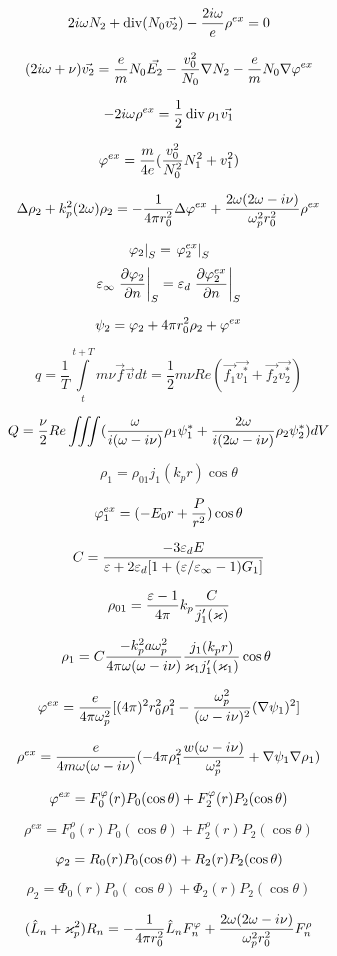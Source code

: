 \documentclass{article}
\begin{document}
\[ 2i\omega N_2 + \operatorname{div}(N_0 \vec{v_2}) - \frac{2i\omega}{e}\rho^{ex} = 0\]

\[ (2i\omega + \nu) \vec{v_2} = \frac{e}{m}N_0\vec{E_2} - \frac{v_0^2}{N_0} \nabla N_2 - \frac{e}{m} N_0 \nabla \varphi^{ex}  \]

\[ - 2i\omega \rho^{ex} = \frac{1}{2}\operatorname{div} \rho_1 \vec{v_1}\]

\[ \varphi^{ex} = \frac{m}{4e}(\frac{v_0^2}{N_0^2}N_1^2 + v_1^2)\]

\[ \Delta \rho_2 + k_p^2(2\omega)\rho_2 = -\frac{1}{4 \pi r_0^2} \Delta \varphi^{ex} + \frac{2\omega(2\omega - i \nu)}{\omega_p^2r_0^2} \rho^{ex}\]

\[ \left. \varphi_2 \right|_{ S} = \left. \varphi_2^{ex} \right|_{ S} \]
\[ \varepsilon_\infty \left.\frac{\partial \varphi_2}{\partial n}\right|_{ S} = \varepsilon_d \left.\frac{\partial \varphi_2^{ex}}{\partial n}\right|_{ S}  \]



\[ \psi_2 = \varphi_2 + 4 \pi r_0^2 \rho_2 + \varphi^{ex}\]

\[ q = \frac{1}{T} \int\limits_t^{t+T} m \nu \vec{f} \vec{v} dt = \frac{1}{2} m \nu Re(\vec{f_1} \vec{v_1^*} +\vec{f_2} \vec{v_2^*})\]

\[ Q = \frac{\nu}{2} Re \iiint (\frac{\omega}{i(\omega - i \nu)}\rho_1 \psi_1^* + \frac{2\omega}{i(2\omega - i \nu)}\rho_2 \psi_2^*)dV\]

\[ \rho_1 = \rho_{01}j_1(k_pr)\cos\theta\]

\[ \varphi_1^{ex} = (-E_0r + \frac{P}{r^2})\cos\theta\]

\[ C= \frac{-3\varepsilon_dE}{\varepsilon + 2\varepsilon_d [1 + (\varepsilon/\varepsilon_\infty - 1) G_1]}\]

\[ \rho_{01} = \frac{\varepsilon -1}{4\pi}k_p\frac{C}{j_1' (\varkappa)}\]

\[ \rho_1 = C \frac{-k_p^2a\omega_p^2}{4\pi\omega(\omega - i \nu) } \frac{j_1(k_p r)}{\varkappa_1 j_1' (\varkappa_1)}\cos\theta\ \]

\[ \varphi^{ex} = \frac{e}{4 \pi \omega_p^2}[(4\pi)^2r_0^2\rho_1^2 - \frac{\omega_p^2}{(\omega - i \nu)^2}(\nabla \psi_1)^2] \]

\[ \rho^{ex} = \frac{e}{4 m \omega(\omega - i \nu)}(-4 \pi \rho_1^2 \frac{w(\omega - i \nu)}{\omega_p^2} + \nabla \psi_1\nabla \rho_1)\]

\[ \varphi^{ex} = F_0^\varphi(r)P_0(\cos\theta) + F_2^\varphi(r)P_2(\cos\theta)\]

\[ \rho^{ex} = F_0^\rho(r)P_0(\cos\theta) + F_2^\rho(r)P_2(\cos\theta)\]

\[ \varphi_2 = R_0(r)P_0(\cos\theta) + R_2(r)P_2(\cos\theta)\]

\[ \rho_2 = \Phi_0(r)P_0(\cos\theta) + \Phi_2(r)P_2(\cos\theta)\]

\[ (\hat L_n + \varkappa_p^2) R_n = -\frac{1}{4 \pi r_0^2}\hat L_n F_n^\varphi  + \frac{2\omega(2\omega - i \nu)}{\omega_p^2r_0^2}F_n^\rho \]
\end{document}
